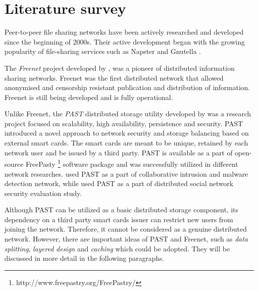 \section{Literature survey}

Peer-to-peer file sharing networks have been actively researched and
developed since the beginning of 2000s. Their active development began
with the growing popularity of file-sharing services such as Napster
\citep{napster} and Gnutella \citep{gnutella}.

The \emph{Freenet} project developed by \citet{freenet}, was
a pioneer of distributed information sharing networks.
Freenet was the first distributed network that allowed anonymised
and censorship resistant publication and distribution of information.
Freenet is still being developed and is fully operational.

Unlike Freenet, the \emph{PAST} distributed storage utility
developed by \citet{past} was a research project focused
on scalability, high availability, persistence
and security. PAST introduced a novel approach to \pp network
security and storage balancing based on external smart cards.
The smart cards are meant to be unique, retained by each network
user and be issued by a third party.
PAST is available as a part of open-source FreePasty
\footnote{http://www.freepastry.org/FreePastry/} software package
and was successfully utilized in different \pp network researches.
\citet{p2p-intrusion} used PAST as a part of \pp collaborative
intrusion and malware detection network, while
\citet{p2p-social-security} used PAST as a part of distributed
social network security evaluation study.

Although PAST can be utilized as a basic distributed storage
component, its dependency on a third party smart
cards issuer can restrict new users from joining the network.
Therefore, it cannot be considered as a genuine distributed network.
However, there are important ideas of PAST and Freenet, such as
\emph{data splitting}, \emph{layered design} and \emph{caching}
which could be adopted. They will be discussed in more detail in
the following paragraphs. 


